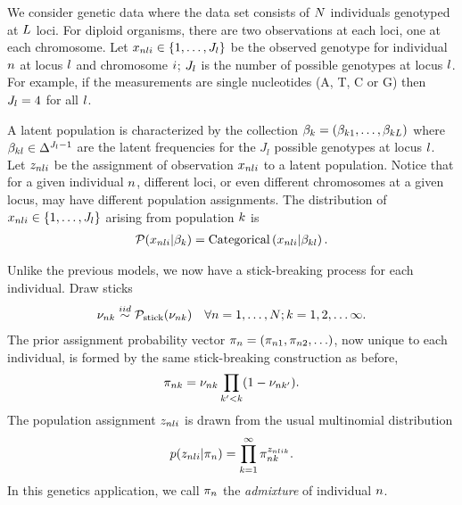 \begin{ex}

We consider genetic data where the
data set consists of $N$ individuals genotyped at $L$ loci.
For diploid organisms, there are two observations at each loci, one at each chromosome.
Let $x_{nli}\in\{1, \ldots, J_l\}$ be the observed genotype for
individual $n$ at locus $l$ and chromosome $i$;
$J_l$ is the number of possible genotypes at locus $l$.
For example, if the measurements are single nucleotides (A, T, C or G)
then $J_l = 4$ for all $l$.

A latent population is characterized by the collection
$\beta_k = (\beta_{k1}, \ldots, \beta_{kL})$ where
$\beta_{kl}\in\Delta^{J_l - 1}$ are the latent frequencies for the $J_l$
possible genotypes at locus $l$.
Let $z_{nli}$ be the assignment of observation $x_{nli}$ to a latent population.
Notice that for a given individual $n$,
different loci, or even different chromosomes at a given locus,
may have different population assignments.
The distribution of $x_{nli}\in\{1, \ldots, J_l\}$ arising from population $k$ is
\begin{align*}
\mathcal{P}(x_{nli} \vert \beta_{k}) =
\mathrm{Categorical}\left(x_{nli}\vert \beta_{kl}\right).
\end{align*}


Unlike the previous models, we now have a stick-breaking process for each individual.
Draw sticks
\begin{align*}
\nu_{nk} \overset{iid}{\sim} \mathcal{P}_{\mathrm{stick}}(\nu_{nk}) \quad \forall n = 1, \ldots, N; k = 1, 2, \ldots \infty.
\end{align*}
The prior assignment probability vector
$\pi_{n} = (\pi_{n1}, \pi_{n2}, \ldots)$,
now unique to each individual,
is formed by the same stick-breaking construction as before,
%
\begin{align*}
\pi_{nk} = \nu_{nk} \prod_{k' < k} (1 - \nu_{nk'}).
\end{align*}
%
The population assignment $z_{nli}$
is drawn from the
usual multinomial distribution
%
\begin{align*}
p(z_{nli} | \pi_n) = \prod_{k=1}^{\infty} \pi_{nk}^{z_{nlik}}.
\end{align*}
%
In this genetics application,
we call $\pi_{n}$ the
\textit{admixture} of individual $n$.



\end{ex}

